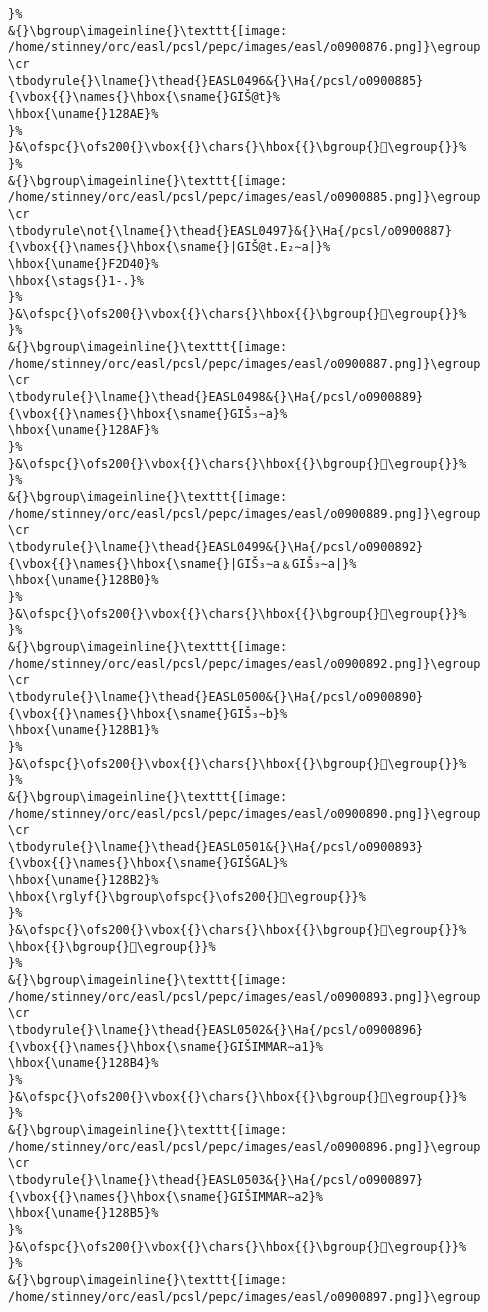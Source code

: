 \begin{verbatim}
}%
&{}\bgroup\imageinline{}\texttt{[image: /home/stinney/orc/easl/pcsl/pepc/images/easl/o0900876.png]}\egroup
\cr
\tbodyrule{}\lname{}\thead{}EASL0496&{}\Ha{/pcsl/o0900885}{\vbox{{}\names{}\hbox{\sname{}GIŠ@t}%
\hbox{\uname{}128AE}%
}%
}&\ofspc{}\ofs200{}\vbox{{}\chars{}\hbox{{}\bgroup{}𒢮\egroup{}}%
}%
&{}\bgroup\imageinline{}\texttt{[image: /home/stinney/orc/easl/pcsl/pepc/images/easl/o0900885.png]}\egroup
\cr
\tbodyrule\not{\lname{}\thead{}EASL0497}&{}\Ha{/pcsl/o0900887}{\vbox{{}\names{}\hbox{\sname{}|GIŠ@t.E₂∼a|}%
\hbox{\uname{}F2D40}%
\hbox{\stags{}1-.}%
}%
}&\ofspc{}\ofs200{}\vbox{{}\chars{}\hbox{{}\bgroup{}󲵀\egroup{}}%
}%
&{}\bgroup\imageinline{}\texttt{[image: /home/stinney/orc/easl/pcsl/pepc/images/easl/o0900887.png]}\egroup
\cr
\tbodyrule{}\lname{}\thead{}EASL0498&{}\Ha{/pcsl/o0900889}{\vbox{{}\names{}\hbox{\sname{}GIŠ₃∼a}%
\hbox{\uname{}128AF}%
}%
}&\ofspc{}\ofs200{}\vbox{{}\chars{}\hbox{{}\bgroup{}𒢯\egroup{}}%
}%
&{}\bgroup\imageinline{}\texttt{[image: /home/stinney/orc/easl/pcsl/pepc/images/easl/o0900889.png]}\egroup
\cr
\tbodyrule{}\lname{}\thead{}EASL0499&{}\Ha{/pcsl/o0900892}{\vbox{{}\names{}\hbox{\sname{}|GIŠ₃∼a﹠GIŠ₃∼a|}%
\hbox{\uname{}128B0}%
}%
}&\ofspc{}\ofs200{}\vbox{{}\chars{}\hbox{{}\bgroup{}𒢰\egroup{}}%
}%
&{}\bgroup\imageinline{}\texttt{[image: /home/stinney/orc/easl/pcsl/pepc/images/easl/o0900892.png]}\egroup
\cr
\tbodyrule{}\lname{}\thead{}EASL0500&{}\Ha{/pcsl/o0900890}{\vbox{{}\names{}\hbox{\sname{}GIŠ₃∼b}%
\hbox{\uname{}128B1}%
}%
}&\ofspc{}\ofs200{}\vbox{{}\chars{}\hbox{{}\bgroup{}𒢱\egroup{}}%
}%
&{}\bgroup\imageinline{}\texttt{[image: /home/stinney/orc/easl/pcsl/pepc/images/easl/o0900890.png]}\egroup
\cr
\tbodyrule{}\lname{}\thead{}EASL0501&{}\Ha{/pcsl/o0900893}{\vbox{{}\names{}\hbox{\sname{}GIŠGAL}%
\hbox{\uname{}128B2}%
\hbox{\rglyf{}\bgroup\ofspc{}\ofs200{}𒢲\egroup{}}%
}%
}&\ofspc{}\ofs200{}\vbox{{}\chars{}\hbox{{}\bgroup{}𒢳\egroup{}}%
\hbox{{}\bgroup{}𒢲\egroup{}}%
}%
&{}\bgroup\imageinline{}\texttt{[image: /home/stinney/orc/easl/pcsl/pepc/images/easl/o0900893.png]}\egroup
\cr
\tbodyrule{}\lname{}\thead{}EASL0502&{}\Ha{/pcsl/o0900896}{\vbox{{}\names{}\hbox{\sname{}GIŠIMMAR∼a1}%
\hbox{\uname{}128B4}%
}%
}&\ofspc{}\ofs200{}\vbox{{}\chars{}\hbox{{}\bgroup{}𒢴\egroup{}}%
}%
&{}\bgroup\imageinline{}\texttt{[image: /home/stinney/orc/easl/pcsl/pepc/images/easl/o0900896.png]}\egroup
\cr
\tbodyrule{}\lname{}\thead{}EASL0503&{}\Ha{/pcsl/o0900897}{\vbox{{}\names{}\hbox{\sname{}GIŠIMMAR∼a2}%
\hbox{\uname{}128B5}%
}%
}&\ofspc{}\ofs200{}\vbox{{}\chars{}\hbox{{}\bgroup{}𒢵\egroup{}}%
}%
&{}\bgroup\imageinline{}\texttt{[image: /home/stinney/orc/easl/pcsl/pepc/images/easl/o0900897.png]}\egroup

\end{verbatim}
